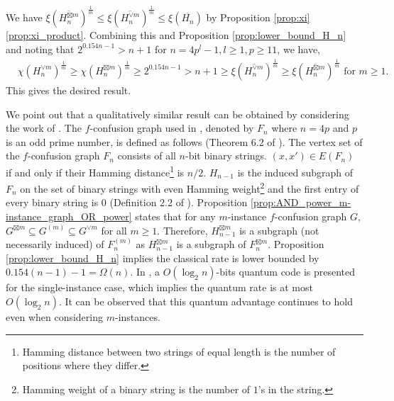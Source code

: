 \documentclass[journal, onecolumn, draftcls]{IEEEtran}
\theoremstyle{definition}
\newcommand{\bbC}{\mathbb{C}}
\newcommand{\aditya}[1]{\marginpar{+}{\bf Aditya's remark}: {\em #1}}
\begin{document}
We have $\xi(\overline{H_n^{\boxtimes m}})^{\frac{1}{m}} \le \xi(\overline{H_n^{\lor m}})^{\frac{1}{m}} \le \xi(\overline{H_n})$
by Proposition \ref{prop:xi}  \ref{prop:xi_product}. 
Combining this and Proposition \ref{prop:lower_bound_H_n} and noting that $2^{0.154n-1} > n+1$ for $n=4p^l-1,l\ge 1,p\ge 11$, we have,
\begin{align*}%
&\chi(H_n^{\lor m})^{\frac{1}{m}} \ge\chi(H_n^{\boxtimes m})^{\frac{1}{m}} \ge 2^{0.154n - 1} >n+1
\ge \xi(\overline{H_n^{\lor m}})^{\frac{1}{m}} \ge \xi(\overline{H_n^{\boxtimes m}})^{\frac{1}{m}}\text{ for }m\ge 1.
\end{align*}
This gives the desired result. 

We point out that a qualitatively similar result can be obtained by considering the work of \cite{Bar-YossefJK08}. The $f$-confusion graph used in \cite{Bar-YossefJK08}, denoted by $F_n$ where $n=4p$ and $p$ is an odd prime number, is defined as follows (Theorem 6.2 of \cite{Bar-YossefJK08}). The vertex set of the $f$-confusion graph $F_n$ consists of all $n$-bit binary strings. $(x,x')\in E(F_n)$ if and only if their Hamming distance\footnote{Hamming distance between two strings of equal length is the number of positions where they differ.} is $n/2$.   $H_{n-1}$ is the induced subgraph of $F_n$ on the set of binary strings with even Hamming weight\footnote{Hamming weight of a binary string is the number of $1$'s in the string.} and the first entry of every binary string is $0$ (Definition 2.2 of \cite{BrietBL_15}).  Proposition \ref{prop:AND_power_m-instance_graph_OR_power} states that for any $m$-instance $f$-confusion graph $G$, $G^{\boxtimes m}\subseteq G^{(m)}\subseteq G^{\lor m}$ for all $m\ge 1$. Therefore, $H_{n-1}^{\boxtimes m} $ is a subgraph (not necessarily induced) of $F_n^{(m)}$ as $H_{n-1}^{\boxtimes m}$ is a subgraph of $F_n^{\boxtimes m}$.  Proposition \ref{prop:lower_bound_H_n} implies the classical rate is lower bounded by $0.154 (n-1) - 1=\Omega(n)$. In \cite{Bar-YossefJK08}, a $O(\log_2 n)$-bits quantum code is presented for the single-instance case, which implies the quantum rate is at most $O(\log_2 n)$. It can be observed that this quantum advantage continues to hold even when considering $m$-instances.
\end{document}
